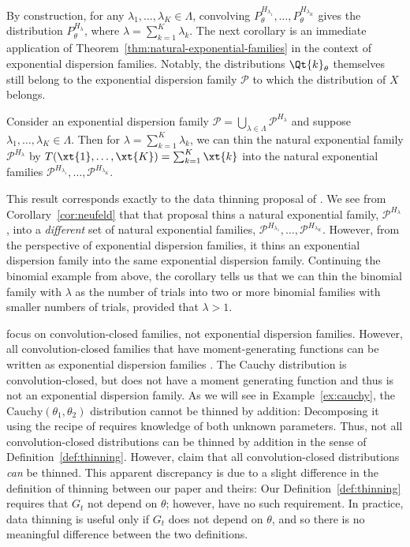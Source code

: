 \documentclass[12pt]{article}
\begin{document}
By construction, for any $\lambda_1,\ldots,\lambda_K\in\Lambda$, convolving $P^{H_{\lambda_1}}_\theta,\ldots,P^{H_{\lambda_K}}_\theta$ gives the distribution $P^{H_\lambda}_\theta$, where $\lambda=\sum_{k=1}^K\lambda_k$.  The next corollary is an immediate application of Theorem~\ref{thm:natural-exponential-families} in the context of exponential dispersion families.
Notably, 
 the distributions $\Qt{k}_\theta$ themselves still belong to the exponential dispersion family $\mathcal P$ to which the distribution of $X$ belongs. 
\begin{corollary} \label{cor:neufeld}
Consider an exponential dispersion family $\mathcal{P} = \bigcup_{\lambda \in \Lambda}\mathcal P^{H_\lambda}$ and suppose $\lambda_1,\ldots,\lambda_K\in\Lambda$.  Then for $\lambda=\sum_{k=1}^K\lambda_k$, we can thin the natural exponential family $\mathcal P^{H_\lambda}$ by $T(\xt{1},\ldots,\xt{K})=\sum_{k=1}^K\xt{k}$ into the natural exponential families $\mathcal P^{H_{\lambda_1}},\ldots,\mathcal P^{H_{\lambda_K}}$.
\end{corollary}
This result corresponds exactly to the data thinning proposal of  \cite{neufeld2023data}.  We see from Corollary~\ref{cor:neufeld} that that proposal thins a natural exponential family, $\mathcal P^{H_\lambda}$, into a \emph{different} set of natural exponential families, 
$\mathcal P^{H_{\lambda_1}},\ldots,\mathcal P^{H_{\lambda_K}}$. However, 
 from the perspective of exponential dispersion families, it thins an exponential dispersion family into the same exponential dispersion family.  Continuing the binomial example from above, the corollary tells us that we can thin the binomial family with $\lambda$ as the number of trials into two or more binomial families with smaller numbers of trials, provided that $\lambda>1$.

\cite{neufeld2023data} focus on convolution-closed families, not exponential dispersion families. However, all convolution-closed families that have moment-generating functions can be written as exponential dispersion families \citep{jorgensen1998stationary}. The Cauchy distribution is convolution-closed, but does not have a moment generating function and thus is not an exponential dispersion family. As we will see in Example~\ref{ex:cauchy}, the $\text{Cauchy}(\theta_1, \theta_2)$ distribution cannot be thinned by addition: Decomposing it using the recipe of \citet{neufeld2023data} requires knowledge of both unknown parameters. Thus, not all convolution-closed distributions can be thinned by addition in the sense of Definition~\ref{def:thinning}. However, \cite{neufeld2023data} claim that all convolution-closed distributions \emph{can} be thinned. This apparent discrepancy  is due to a slight difference in the definition of thinning between our paper and theirs: Our Definition~\ref{def:thinning} requires that $G_t$ not depend on $\theta$; however, \cite{neufeld2023data} have no such requirement. In practice, data thinning is useful only if $G_t$ does not depend on $\theta$, and so there is no meaningful difference between the two definitions.
 
\end{document}
